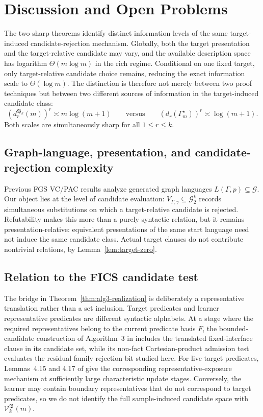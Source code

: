 \documentclass[11pt]{article}
\theoremstyle{definition}
\theoremstyle{remark}
\newcommand{\Gtwo}{\mathcal G_2}
\begin{document}
\section{Discussion and Open Problems}
\label{sec:discussion}

The two sharp theorems identify distinct information levels of the same
target-induced candidate-rejection mechanism.  Globally, both the target
presentation and the target-relative candidate may vary, and the available
description space has logarithm \(\Theta(m\log m)\) in the rich regime.
Conditional on one fixed target, only target-relative candidate choice
remains, reducing the exact information scale to \(\Theta(\log m)\).  The
distinction is therefore not merely between two proof techniques but between
two different sources of information in the target-induced candidate class:
\[
\boxed{
(d_r^{\mathfrak B_k}(m))^r\asymp m\log(m+1)
}
\qquad\text{versus}\qquad
\boxed{
(d_r(\Gamma_m^\star))^r\asymp\log(m+1).
}
\]
Both scales are simultaneously sharp for all \(1\le r\le k\).

\subsection{Graph-language, presentation, and candidate-rejection complexity}

Previous FGS VC/PAC results analyze generated graph languages
\(L(\Gamma,p)\subseteq\mathcal G.\)
Our object lies at the level of candidate evaluation:
\(V_{\Gamma,\gamma}\subseteq\Gtwo^k\)
records simultaneous substitutions on which a target-relative candidate is
rejected.  Refutability makes this more than a purely syntactic relation, but
it remains presentation-relative: equivalent presentations of the same start
language need not induce the same candidate class.  Actual target clauses do
not contribute nontrivial relations, by Lemma~\ref{lem:target-zero}.

\subsection{Relation to the FICS candidate test}

The bridge in Theorem~\ref{thm:alg3-realization} is deliberately a
representative translation rather than a set inclusion.  Target predicates
and learner representative predicates are different syntactic alphabets.  At
a stage where the required representatives belong to the current predicate
basis \(F\), the bounded-candidate construction of Algorithm~3 in
\cite{ShoudaiEtAl2026} includes the translated fixed-interface clause in its
candidate set, while its non-fact Cartesian-product admission test evaluates
the residual-family rejection bit studied here.  For live target predicates, Lemmas~4.15 and 4.17 of
\cite{ShoudaiEtAl2026} give the corresponding representative-exposure
mechanism at sufficiently large characteristic update stages.  Conversely,
the learner may contain boundary representatives that do not correspond to
target predicates, so we do not identify the full sample-induced candidate
space with \(\mathcal V_k^{\mathfrak B}(m)\).
\end{document}
